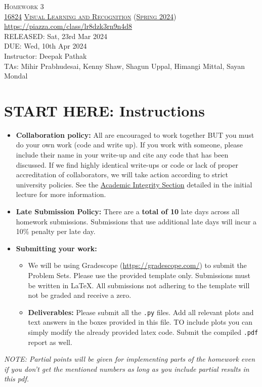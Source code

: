 \documentclass[11pt,addpoints,answers]{exam}
\title{\textsc{\hwName}} %
\author{}
\date{}
\date{}
\numberwithin{equation}{section} %
\numberwithin{figure}{section} %
\numberwithin{table}{section} %
\newcommand{\courseNum}{\href{https://visual-learning.cs.cmu.edu/}{16824}}
\newcommand{\courseName}{\href{https://visual-learning.cs.cmu.edu/}{Visual Learning and Recognition}}
\newcommand{\courseSem}{\href{https://visual-learning.cs.cmu.edu/}{Spring 2024}}
\newcommand{\courseUrl}{\url{https://piazza.com/class/lr8dzk3rn9n4d8}}
\newcommand{\hwNum}{Homework 3}
\newcommand{\hwTopic}{Transformers}
\newcommand{\outDate}{Sat, 23rd Mar 2024}
\newcommand{\dueDate}{Wed, 10th Apr 2024}
\newcommand{\instructorName}{Deepak Pathak}
\newcommand{\taNames}{Mihir Prabhudesai, Kenny Shaw, Shagun Uppal, Himangi Mittal, Sayan Mondal}
\begin{document}
\section*{}
\begin{center}
  \textsc{\LARGE \hwNum} \\
  \vspace{1em}
  \textsc{\large \courseNum{} \courseName{} (\courseSem)} \\
  \courseUrl\\
  \vspace{1em}
  RELEASED: \outDate \\
  DUE: \dueDate \\
  Instructor: \instructorName \\
  TAs: \taNames
\end{center}

\section*{START HERE: Instructions}
\begin{itemize}
\item \textbf{Collaboration policy:} All are encouraged to work together BUT you must do your own work (code and write up). If you work with someone, please include their name in your write-up and cite any code that has been discussed. If we find highly identical write-ups or code or lack of proper accreditation of collaborators, we will take action according to strict university policies. See the \href{hhttps://www.cmu.edu/policies/student-and-student-life/academic-integrity.html}{Academic Integrity Section} detailed in the initial lecture for more information.

\item\textbf{Late Submission Policy:} There are a \textbf{total of 10} late days across all homework submissions. Submissions that use additional late days will incur a 10\% penalty per late day.


\item\textbf{Submitting your work:}

\begin{itemize}

\item We will be using Gradescope (\url{https://gradescope.com/}) to submit the Problem Sets. Please use the provided template only. Submissions must be written in LaTeX. All submissions not adhering to the template will not be graded and receive a zero. 
\item \textbf{Deliverables:} Please submit all the \texttt{.py} files. Add all relevant plots and text answers in the boxes provided in this file. TO include plots you can simply modify the already provided latex code. Submit the compiled \texttt{.pdf} report as well.
\end{itemize}
\end{itemize}
\emph{NOTE: Partial points will be given for implementing parts of the homework even if you don't get the mentioned numbers as long as you include partial results in this pdf.}
\clearpage
\end{document}
